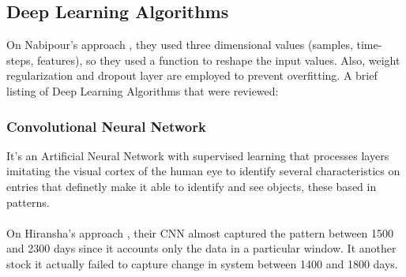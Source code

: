 \documentclass[conference]{IEEEtran}
\begin{document}
\subsection{Deep Learning Algorithms}

On Nabipour's approach \cite{nabipour2020predicting}, they used three dimensional values (samples, time-steps, features), so they used a function to reshape
the input values. Also, weight regularization and dropout layer are employed to prevent overfitting.
A brief listing of Deep Learning Algorithms that were reviewed:

\subsubsection{Convolutional Neural Network}
It's an Artificial Neural Network with supervised learning that processes layers imitating the visual cortex
of the human eye to identify several characteristics on entries that definetly make it able to identify and see objects, these based in patterns.
\\\\
On Hiransha's approach \cite{M2018}, their CNN almost captured the pattern between 1500 and 2300 days since it accounts only the data in a particular window. It another stock it actually failed to capture change in system between 1400 and 1800 days.
\\\\
\end{document}
